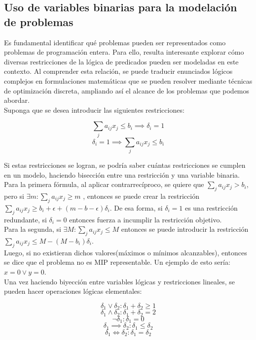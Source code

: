 \documentclass[12pt]{report}
\begin{document}
\subsection{Uso de variables binarias para la modelación de problemas}


Es fundamental identificar qué problemas pueden ser representados como problemas de programación entera. Para ello, resulta interesante explorar cómo diversas restricciones de la lógica de predicados pueden ser modeladas en este contexto. Al comprender esta relación, se puede traducir enunciados lógicos complejos en formulaciones matemáticas que se pueden resolver mediante técnicas de optimización discreta, ampliando así el alcance de los problemas que podemos abordar.\\

Suponga que se desea introducir las siguientes restricciones:

$$ \sum_j a_{ij}x_j \leq  b_i \implies  \delta_i = 1$$
$$  \delta_i = 1 \implies  \sum_j a_{ij}x_j \leq  b_i$$

Si estas restricciones se logran, se podría saber cuántas restricciones se cumplen en un modelo, haciendo bisección entre una restricción y una variable binaria.\\

Para la primera fórmula, al aplicar contrarrecíproco, se quiere que $\sum_j a_{ij}x_j > b_i$, pero si $\exists m:\sum_j a_{ij}x_j\geq  m$ , entonces se puede crear la restricción $\sum_j a_{ij}x_j \geq  b_i+\epsilon+(m-b-\epsilon)\delta_i$. De esa forma, si $\delta_i=1$ es una restricción redundante, si $\delta_i=0$ entonces fuerza a incumplir la restricción objetivo.\\

Para la segunda, si $\exists M:\sum_j a_{ij}x_j\leq  M$ entonces se puede introducir la restricción $\sum_j a_{ij}x_j \leq  M-(M-b_i)\delta_i$. \\

Luego, si no existieran dichos valores(máximos o mínimos alcanzables), entonces se dice que el problema no es MIP representable. Un ejemplo de esto sería: $x=0\lor  y=0$.\\

Una vez haciendo biyección entre variables lógicas y restricciones lineales, se pueden hacer operaciones lógicas elementales:

$$\delta_1 \lor  \delta_2:\delta_1+\delta_2\geq 1$$
$$\delta_1 \land \delta_2:\delta_1+\delta_2=2$$
$$\neg\delta_1 :\delta_1=0$$
$$\delta_1 \implies  \delta_2:\delta_1\leq  \delta_2$$
$$\delta_1 \iff \delta_2:\delta_1=\delta_2$$
\end{document}
